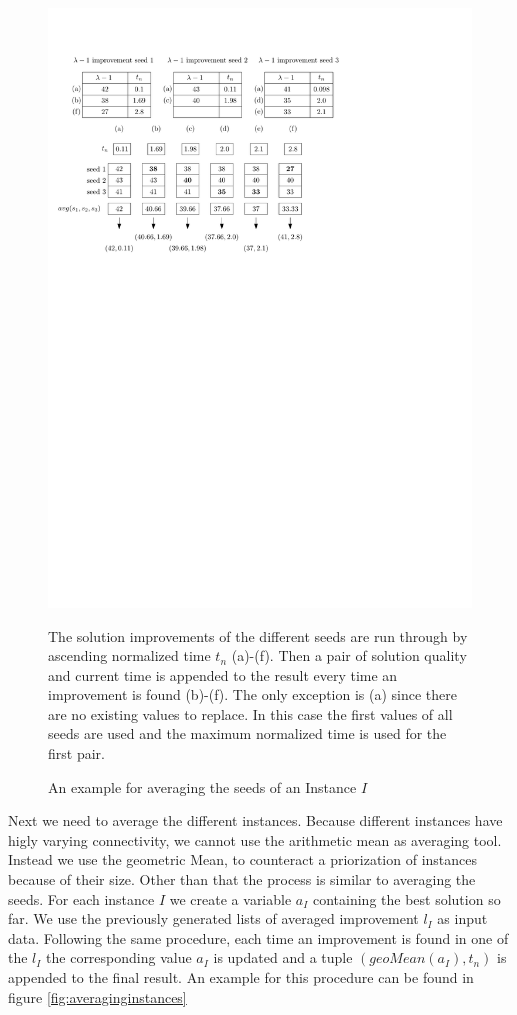 \documentclass[a4paper,12pt,titlepage, BCOR7mm,headsepline]{scrbook}
\numberwithin{equation}{section}
\begin{document}
\begin{figure}[H] 
    
  \begin{center}
   \includegraphics[width=.9\textwidth]{Ipe/seed_averaging_example.pdf}
  \caption{An example for averaging the seeds of an Instance $I$}\label{fig:averagingseeds} %
  \end{center}
    The solution improvements of the different seeds are run through by ascending normalized time $t_n$ (a)-(f). Then a pair of solution quality and current time is appended to the result every time an improvement is found (b)-(f). The only exception is (a) since there are no existing values to replace. In this case the first values of all seeds are used and the maximum normalized time is used for the first pair.
\end{figure}

Next we need to average the different instances. Because different instances have higly varying connectivity, we cannot use the arithmetic mean as averaging tool. Instead we use the geometric Mean, to counteract a priorization of instances because of their size. Other than that the process is similar to averaging the seeds. For each instance $I$ we create a variable $a_I$ containing the best solution so far. We use the previously generated lists of averaged improvement $l_I$ as input data. Following the same procedure, each time an improvement is found in one of the $l_I$ the corresponding value $a_I$ is updated and a tuple $(geoMean(a_I), t_n)$ is appended to the final result. An example for this procedure can be found in figure \ref{fig:averaginginstances}
\end{document}
